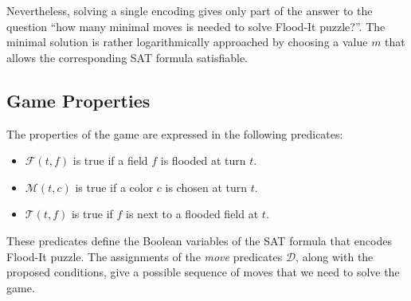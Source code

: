 \documentclass[conference]{IEEEtran}
\newcommand{\quotes}[1]{``#1''}
\newcommand{\nMoves}{\ensuremath{m}\xspace}
\newcommand{\clr}{\ensuremath{c}\xspace}
\newcommand{\flood}[2]{\ensuremath{\mathcal{F}(#1,#2)}\xspace}
\newcommand{\move}[2]{\ensuremath{\mathcal{M}(#1,#2)}\xspace}
\newcommand{\touch}[2]{\ensuremath{\mathcal{T}(#1,#2)}\xspace}
\newcommand{\turn}{\ensuremath{t}\xspace}
\newcommand{\field}{\ensuremath{f}\xspace}
\begin{document}
Nevertheless, solving a single encoding gives only part of the answer to the question \quotes{how many minimal moves is needed to solve Flood-It puzzle?}. The minimal solution is rather logarithmically approached by choosing a value \nMoves that allows the corresponding SAT formula satisfiable.
\subsection{Game Properties}
The properties of the game are expressed in the following predicates: 
\begin{itemize}
	\item \flood{\turn}{\field} is true if a field \field is flooded at turn \turn. 
	\item \move{\turn}{\clr} is true if a color \clr is chosen at turn \turn. 
	\item \touch{\turn}{\field} is true if \field is next to a flooded field at \turn. 
\end{itemize}

These predicates define the Boolean variables of the SAT formula that encodes Flood-It puzzle. The assignments of the \emph{move} predicates $\mathcal{D}$, along with the proposed conditions, give a possible sequence of moves that we need to solve the game. 
\end{document}
